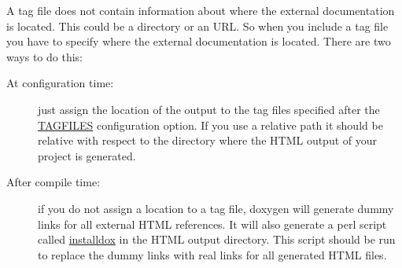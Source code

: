 A tag file does not contain information about where the external documentation is located. This could be a directory or an URL. So when you include a tag file you have to specify where the external documentation is located. There are two ways to do this: \begin{description}
\item[At configuration time:]just assign the location of the output to the tag files specified after the \hyperlink{config_cfg_tagfiles}{TAGFILES} configuration option. If you use a relative path it should be relative with respect to the directory where the HTML output of your project is generated. \item[After compile time:]if you do not assign a location to a tag file, doxygen will generate dummy links for all external HTML references. It will also generate a perl script called \hyperlink{installdox_usage}{installdox} in the HTML output directory. This script should be run to replace the dummy links with real links for all generated HTML files. \end{description}


